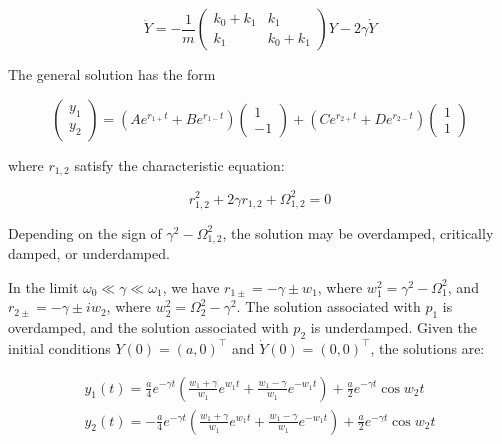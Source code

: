 \documentclass[12pt]{article}
\begin{document}
\begin{equation}
    \ddot{Y} =
    -\frac{1}{m}
    \begin{pmatrix}
        k_{0} + k_{1} & k_{1}         \\
        k_{1}         & k_{0} + k_{1}
    \end{pmatrix}
    Y
    -2\gamma
    \dot{Y}
\end{equation}

The general solution has the form

\begin{equation}
    \begin{pmatrix}
        y_{1} \\
        y_{2}
    \end{pmatrix} =
    (Ae^{r_{1+}t} + Be^{r_{1-}t})
    \begin{pmatrix}
        1 \\
        -1
    \end{pmatrix}
    +
    (Ce^{r_{2+}t} + De^{r_{2-}t})
    \begin{pmatrix}
        1 \\
        1
    \end{pmatrix}
\end{equation}

where $r_{1,2}$ satisfy the characteristic equation:

\begin{equation}
    r_{1,2}^{2} + 2\gamma r_{1,2} + \Omega_{1,2}^{2} = 0
\end{equation}

Depending on the sign of $\gamma^{2} - \Omega_{1,2}^{2}$, the solution may be overdamped, critically damped, or underdamped.

In the limit $\omega_{0} \ll \gamma \ll \omega_{1}$, we have $r_{1\pm} = -\gamma \pm w_{1}$, where $w_{1}^{2} = \gamma^{2} - \Omega_{1}^{2}$, and $r_{2\pm} = -\gamma \pm iw_{2}$, where $w_{2}^{2} = \Omega_{2}^{2} - \gamma^{2}$. The solution associated with $p_{1}$ is overdamped, and the solution associated with $p_{2}$ is underdamped. Given the initial conditions $Y(0) = (a, 0)^{\intercal}$ and $\dot{Y}(0) = (0, 0)^{\intercal}$, the solutions are:

\begin{equation}
    \begin{split}
        y_{1}(t) = \frac{a}{4} e^{-\gamma t} \left( \frac{w_{1} + \gamma}{w_{1}} e^{w_{1}t} + \frac{w_{1} - \gamma}{w_{1}} e^{-w_{1}t} \right) + \frac{a}{2} e^{-\gamma t} \cos{w_{2}t} \\
        y_{2}(t) = -\frac{a}{4} e^{-\gamma t} \left( \frac{w_{1} + \gamma}{w_{1}} e^{w_{1}t} + \frac{w_{1} - \gamma}{w_{1}} e^{-w_{1}t} \right) + \frac{a}{2} e^{-\gamma t} \cos{w_{2}t}
    \end{split}
\end{equation}
\end{document}
